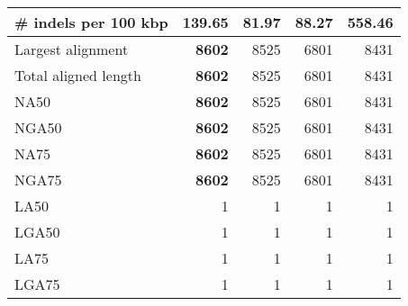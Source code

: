 \documentclass[12pt,a4paper]{article}
\begin{document}
\begin{table}[ht]
\begin{center}
\begin{tabular}{|l*{4}{|r}|}
\# indels per 100 kbp & 139.65 & {\bf 81.97} & 88.27 & 558.46 \\ \hline
Largest alignment & {\bf 8602} & 8525 & 6801 & 8431 \\ \hline
Total aligned length & {\bf 8602} & 8525 & 6801 & 8431 \\ \hline
NA50 & {\bf 8602} & 8525 & 6801 & 8431 \\ \hline
NGA50 & {\bf 8602} & 8525 & 6801 & 8431 \\ \hline
NA75 & {\bf 8602} & 8525 & 6801 & 8431 \\ \hline
NGA75 & {\bf 8602} & 8525 & 6801 & 8431 \\ \hline
LA50 & 1 & 1 & 1 & 1 \\ \hline
LGA50 & 1 & 1 & 1 & 1 \\ \hline
LA75 & 1 & 1 & 1 & 1 \\ \hline
LGA75 & 1 & 1 & 1 & 1 \\ \hline
\end{tabular}
\end{center}
\end{table}
\end{document}
